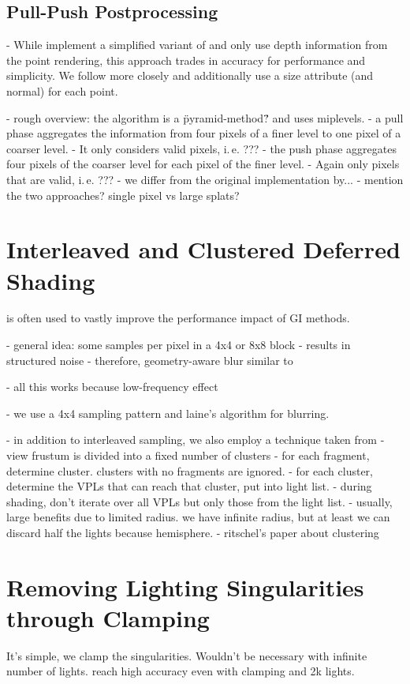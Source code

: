 \subsection{Pull-Push Postprocessing}

- While \citep{ritschel2008ism} implement a simplified variant of \citet{Marroquim:2007:reconstruction} and only use depth information from the point rendering, this approach trades in accuracy for performance and simplicity. We follow \citet{Marroquim:2007:reconstruction} more closely and additionally use a size attribute (and normal) for each point.

- rough overview: the algorithm is a \"pyramid-method\"? and uses miplevels.
- a pull phase aggregates the information from four pixels of a finer level to one pixel of a coarser level.
- It only considers valid pixels, i.\,e. ???
- the push phase aggregates four pixels of the coarser level for each pixel of the finer level.
- Again only pixels that are valid, i.\,e. ???
- we differ from the original implementation by...
- mention the two approaches? single pixel vs large splats?



\section{Interleaved and Clustered Deferred Shading}
\label{sec:interleavedAndClusteredShading}
\citep{Keller:2001:InterleavedSampling} is often used to vastly improve the performance impact of GI methods.

- general idea: some samples per pixel in a 4x4 or 8x8 block
- results in structured noise
- therefore, geometry-aware blur similar to \citet{laine2007incremental}

- all this works because low-frequency effect

- we use a 4x4 sampling pattern and laine's algorithm for blurring.


- in addition to interleaved sampling, we also employ a technique taken from \citet{olsson2012clustered}
- view frustum is divided into a fixed number of clusters
- for each fragment, determine cluster. clusters with no fragments are ignored.
- for each cluster, determine the VPLs that can reach that cluster, put into light list.
- during shading, don't iterate over all VPLs but only those from the light list.
- usually, large benefits due to limited radius. we have infinite radius, but at least we can discard half the lights because hemisphere.
- ritschel's paper about clustering

\section{Removing Lighting Singularities through Clamping}
\label{sec:clamping}
It's simple, we clamp the singularities. Wouldn't be necessary with infinite number of lights. \citet{hedman2016sequential} reach high accuracy even with clamping and 2k lights.

